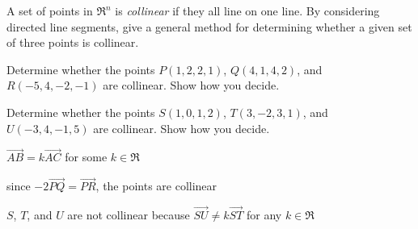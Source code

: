 
\begin{Exercise}[
name={},
title={}, 
difficulty=0,
origin={\cite{SM}}]
A set of points in $\Re^n$ is \emph{collinear} if they all line on one line.
\Question By considering directed line segments, give a general method for determining whether a given set of three points is collinear.

\Question Determine whether the points $P(1,2,2,1)$, $Q(4,1,4,2)$, and $R(-5,4,-2,-1)$ are collinear. Show how you decide.

\Question Determine whether the points $S(1,0,1,2)$, $T(3,-2,3,1)$, and $U(-3,4,-1,5)$ are collinear. Show how you decide.
\end{Exercise}

\begin{Answer}
\Question $\overrightarrow{AB}=k\overrightarrow{AC}$ for some $k\in\Re$

\Question since $-2\overrightarrow{PQ}=\overrightarrow{PR}$, the points are collinear

\Question $S$, $T$, and $U$ are not collinear because $\overrightarrow{SU}\neq k\overrightarrow{ST}$ for any $k\in\Re$
\end{Answer}
